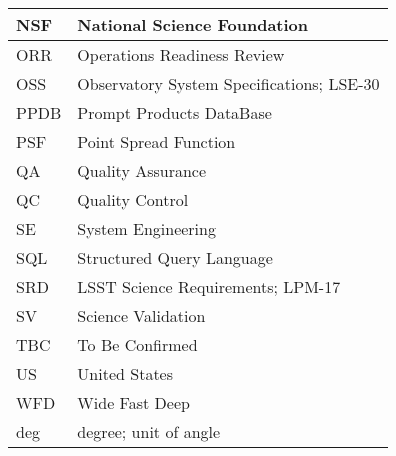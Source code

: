 \begin{longtable}{p{}p{}}
NSF & National Science Foundation \\\hline
ORR & Operations Readiness Review \\\hline
OSS & Observatory System Specifications; LSE-30 \\\hline
PPDB & Prompt Products DataBase \\\hline
PSF & Point Spread Function \\\hline
QA & Quality Assurance \\\hline
QC & Quality Control \\\hline
SE & System Engineering \\\hline
SQL & Structured Query Language \\\hline
SRD & LSST Science Requirements; LPM-17 \\\hline
SV & Science Validation \\\hline
TBC & To Be Confirmed \\\hline
US & United States \\\hline
WFD & Wide Fast Deep \\\hline
deg & degree; unit of angle \\\hline
\end{longtable}

